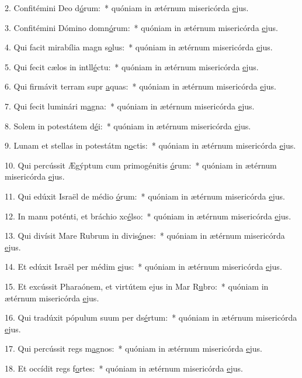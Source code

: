 2. Confitémini Deo d\uline{ó}rum:~* quóniam in ætérnum misericórda \uline{e}jus.\par 
3. Confitémini Dómino domn\uline{ó}rum:~* quóniam in ætérnum misericórda \uline{e}jus.\par 
4. Qui facit mirabília magn s\uline{o}lus:~* quóniam in ætérnum misericórda \uline{e}jus.\par 
5. Qui fecit cælos in intll\uline{é}ctu:~* quóniam in ætérnum misericórda \uline{e}jus.\par 
6. Qui firmávit terram supr \uline{a}quas:~* quóniam in ætérnum misericórda \uline{e}jus.\par 
7. Qui fecit luminári m\uline{a}gna:~* quóniam in ætérnum misericórda \uline{e}jus.\par 
8. Solem in potestátem d\uline{é}i:~* quóniam in ætérnum misericórda \uline{e}jus.\par 
9. Lunam et stellas in potestátm n\uline{o}ctis:~* quóniam in ætérnum misericórda \uline{e}jus.\par 
10. Qui percússit Ægýptum cum primogénitis \uline{ó}rum:~* quóniam in ætérnum misericórda \uline{e}jus.\par 
11. Qui edúxit Israël de médio \uline{ó}rum:~* quóniam in ætérnum misericórda \uline{e}jus.\par 
12. In manu poténti, et bráchio xc\uline{é}lso:~* quóniam in ætérnum misericórda \uline{e}jus.\par 
13. Qui divísit Mare Rubrum in divis\uline{ó}nes:~* quóniam in ætérnum misericórda \uline{e}jus.\par 
14. Et edúxit Israël per médim \uline{e}jus:~* quóniam in ætérnum misericórda \uline{e}jus.\par 
15. Et excússit Pharaónem, et virtútem ejus in Mar R\uline{u}bro:~* quóniam in ætérnum misericórda \uline{e}jus.\par 
16. Qui tradúxit pópulum suum per ds\uline{é}rtum:~* quóniam in ætérnum misericórda \uline{e}jus.\par 
17. Qui percússit regs m\uline{a}gnos:~* quóniam in ætérnum misericórda \uline{e}jus.\par 
18. Et occídit regs f\uline{o}rtes:~* quóniam in ætérnum misericórda \uline{e}jus.\par 
